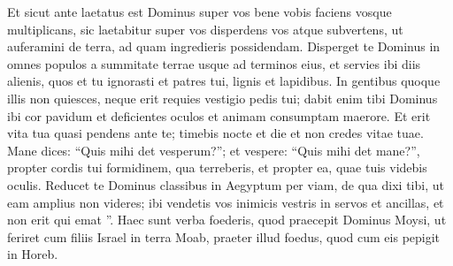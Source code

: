 \begin{biblechapter}
\begin{biblechapter}
\begin{biblechapter}
\begin{biblechapter}
\begin{biblechapter}
\begin{biblechapter}
\begin{biblechapter}
\begin{biblechapter}
\begin{biblechapter}
\begin{biblechapter}
\begin{biblechapter}
\begin{biblechapter}
\begin{biblechapter}
\begin{biblechapter}
\begin{biblechapter}
\begin{biblechapter}
\begin{biblechapter}
\begin{biblechapter}
\begin{biblechapter}
\begin{biblechapter}
\begin{biblechapter}
\begin{biblechapter}
\begin{biblechapter}
\begin{biblechapter}
\begin{biblechapter}
\begin{biblechapter}
\begin{biblechapter}
\begin{biblechapter}
 \verse Et sicut ante laetatus est Dominus super vos bene vobis faciens vosque multiplicans, sic laetabitur super vos disperdens vos atque subvertens, ut auferamini de terra, ad quam ingredieris possidendam. 
\verse Disperget te Dominus in omnes populos a summitate terrae usque ad terminos eius, et servies ibi diis alienis, quos et tu ignorasti et patres tui, lignis et lapidibus. 
 \verse In gentibus quoque illis non quiesces, neque erit requies vestigio pedis tui; dabit enim tibi Dominus ibi cor pavidum et deficientes oculos et animam consumptam maerore. 
\verse Et erit vita tua quasi pendens ante te; timebis nocte et die et non credes vitae tuae. 
\verse Mane dices: “Quis mihi det vesperum?”; et vespere: “Quis mihi det mane?”, propter cordis tui formidinem, qua terreberis, et propter ea, quae tuis videbis oculis. 
\verse Reducet te Dominus classibus in Aegyptum per viam, de qua dixi tibi, ut eam amplius non videres; ibi vendetis vos inimicis vestris in servos et ancillas, et non erit qui emat ”.
 \verse Haec sunt verba foederis, quod praecepit Dominus Moysi, ut feriret cum filiis Israel in terra Moab, praeter illud foedus, quod cum eis pepigit in Horeb.
 

\end{biblechapter}
\end{biblechapter}
\end{biblechapter}
\end{biblechapter}
\end{biblechapter}
\end{biblechapter}
\end{biblechapter}
\end{biblechapter}
\end{biblechapter}
\end{biblechapter}
\end{biblechapter}
\end{biblechapter}
\end{biblechapter}
\end{biblechapter}
\end{biblechapter}
\end{biblechapter}
\end{biblechapter}
\end{biblechapter}
\end{biblechapter}
\end{biblechapter}
\end{biblechapter}
\end{biblechapter}
\end{biblechapter}
\end{biblechapter}
\end{biblechapter}
\end{biblechapter}
\end{biblechapter}
\end{biblechapter}
